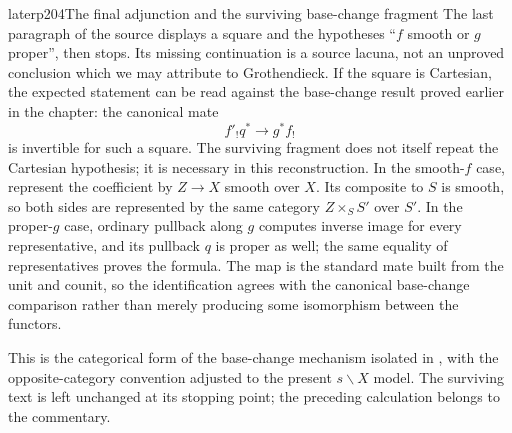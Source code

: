 \begin{dcomment}{later}{p204}{The final adjunction and the surviving base-change fragment}
The last paragraph of the source displays a square and the hypotheses ``$f$ smooth or $g$ proper'', then stops. Its missing continuation is a source lacuna, not an unproved conclusion which we may attribute to Grothendieck. If the square is Cartesian, the expected statement can be read against the base-change result proved earlier in the chapter: the canonical mate
\[
 f'_!q^*\longrightarrow g^*f_!
\]
is invertible for such a square. The surviving fragment does not itself repeat the Cartesian hypothesis; it is necessary in this reconstruction. In the smooth-$f$ case, represent the coefficient by $Z\to X$ smooth over $X$. Its composite to $S$ is smooth, so both sides are represented by the same category $Z\times_S S'$ over $S'$. In the proper-$g$ case, ordinary pullback along $g$ computes inverse image for every representative, and its pullback $q$ is proper as well; the same equality of representatives proves the formula. The map is the standard mate built from the unit and counit, so the identification agrees with the canonical base-change comparison rather than merely producing some isomorphism between the functors.

This is the categorical form of the base-change mechanism isolated in \citet[Proposition~5.3, Theorem~5.4, and Remark~5.5]{Maltsiniotis2005Asphericite}, with the opposite-category convention adjusted to the present $s\backslash X$ model. The surviving text is left unchanged at its stopping point; the preceding calculation belongs to the commentary.
\end{dcomment}
